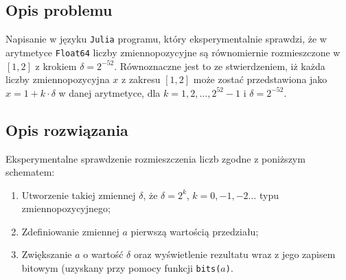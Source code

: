 \documentclass{classrep}
\begin{document}
	\subsection{Opis problemu}
		Napisanie w języku \texttt{Julia} programu, który eksperymentalnie sprawdzi, że w arytmetyce 
		\texttt{Float64} liczby zmiennopozycyjne są równomiernie rozmieszczone w $[1,2]$ z krokiem $\delta = 
		2^{-52}$. Równoznaczne jest to ze stwierdzeniem, iż każda liczby zmiennopozycyjna $x$ z zakresu 
		$[1,2]$ może zostać przedstawiona jako $x = 1 + k \cdot \delta$ w danej arytmetyce, dla 
		$k = 1,2,\dots,2^{52}-1$ i $\delta = 2^{-52}$.
	\subsection{Opis rozwiązania}
		Eksperymentalne sprawdzenie rozmieszczenia liczb zgodne z poniższym schematem:
		\begin{enumerate}
			\item Utworzenie takiej zmiennej $\delta$, że $\delta = 2^{k}$, $k = 0,-1,-2\dots $ typu 
			zmiennopozycyjnego;
			\item Zdefiniowanie zmiennej $a$ pierwszą wartością przedziału;
			\item Zwiększanie $a$ o wartość $\delta$ oraz wyświetlenie rezultatu
			wraz z jego zapisem bitowym (uzyskany przy pomocy funkcji \texttt{bits($a$)}.
		\end{enumerate}
\end{document}
